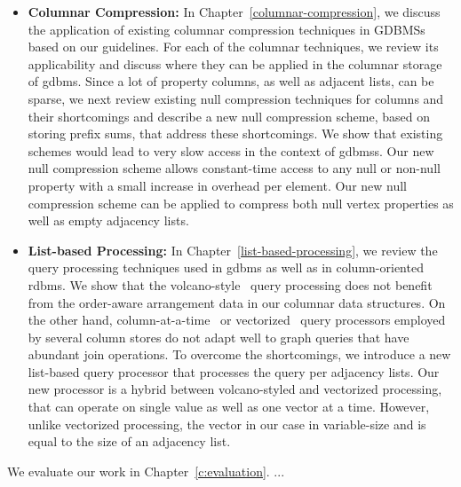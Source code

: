 \begin{itemize}
	\item \textbf{Columnar Compression:} In Chapter~\ref{columnar-compression}, we discuss the application of existing columnar compression techniques in GDBMSs based on our guidelines. For each of the columnar techniques, we review its applicability and discuss where they can be applied in the columnar storage of \gls{gdbms}. Since a lot of property columns, as well as adjacent lists, can be sparse, we next review existing null compression techniques for columns and their shortcomings and describe a new null compression scheme, based on storing prefix sums, that address these shortcomings. We show that existing schemes would lead to very slow access in the context of \gls{gdbms}s. Our new null compression scheme allows constant-time access to any null or non-null property with a small increase in overhead per element. Our new null compression scheme can be applied to compress both null vertex properties as well as empty adjacency lists.
	
	\item \textbf{List-based Processing:} In Chapter~\ref{list-based-processing}, we review the query processing techniques used in \gls{gdbms} as well as in column-oriented \gls{rdbms}. We show that the volcano-style~\cite{volcano} query processing does not benefit from the order-aware arrangement data in our columnar data structures. On the other hand, column-at-a-time~\cite{col-vs-row} or vectorized~\cite{boncz-vectorwise1} query processors employed by several column stores do not adapt well to graph queries that have abundant join operations. To overcome the shortcomings, we introduce a new list-based query processor that processes the query per adjacency lists. Our new processor is a hybrid between volcano-styled and vectorized processing, that can operate on single value as well as one vector at a time. However, unlike vectorized processing, the vector in our case in variable-size and is equal to the size of an adjacency list.
\end{itemize}

We evaluate our work in Chapter~\ref{c:evaluation}. ...
